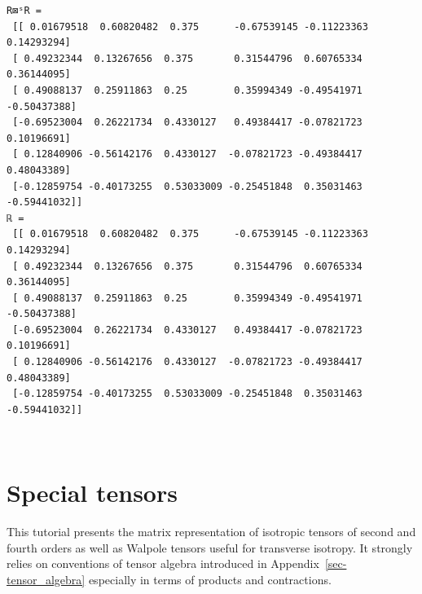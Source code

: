 \documentclass[
  a4paper,
  numbers=noendperiod,
  DIV=12]{scrreprt}
\begin{document}
\begin{verbatim}
R⊠ˢR =
 [[ 0.01679518  0.60820482  0.375      -0.67539145 -0.11223363  0.14293294]
 [ 0.49232344  0.13267656  0.375       0.31544796  0.60765334  0.36144095]
 [ 0.49088137  0.25911863  0.25        0.35994349 -0.49541971 -0.50437388]
 [-0.69523004  0.26221734  0.4330127   0.49384417 -0.07821723  0.10196691]
 [ 0.12840906 -0.56142176  0.4330127  -0.07821723 -0.49384417  0.48043389]
 [-0.12859754 -0.40173255  0.53033009 -0.25451848  0.35031463 -0.59441032]]
ℝ =
 [[ 0.01679518  0.60820482  0.375      -0.67539145 -0.11223363  0.14293294]
 [ 0.49232344  0.13267656  0.375       0.31544796  0.60765334  0.36144095]
 [ 0.49088137  0.25911863  0.25        0.35994349 -0.49541971 -0.50437388]
 [-0.69523004  0.26221734  0.4330127   0.49384417 -0.07821723  0.10196691]
 [ 0.12840906 -0.56142176  0.4330127  -0.07821723 -0.49384417  0.48043389]
 [-0.12859754 -0.40173255  0.53033009 -0.25451848  0.35031463 -0.59441032]]
\end{verbatim}

\(\,\)

\chapter{Special tensors}\label{sec-special_tensors}

\begin{tcolorbox}[enhanced jigsaw, arc=.35mm, bottomrule=.15mm, bottomtitle=1mm, breakable, colback=white, colbacktitle=quarto-callout-important-color!10!white, colframe=quarto-callout-important-color-frame, coltitle=black, left=2mm, leftrule=.75mm, opacityback=0, opacitybacktitle=0.6, rightrule=.15mm, title={Objectives}, titlerule=0mm, toprule=.15mm, toptitle=1mm]

This tutorial presents the matrix representation of isotropic tensors of
second and fourth orders as well as Walpole tensors useful for
transverse isotropy. It strongly relies on conventions of tensor algebra
introduced in Appendix~\ref{sec-tensor_algebra} especially in terms of
products and contractions.

\end{tcolorbox}
\end{document}
